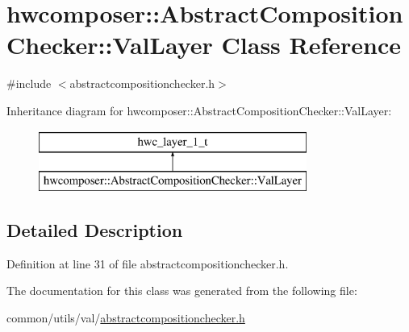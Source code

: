 \hypertarget{classhwcomposer_1_1AbstractCompositionChecker_1_1ValLayer}{}\section{hwcomposer\+:\+:Abstract\+Composition\+Checker\+:\+:Val\+Layer Class Reference}
\label{classhwcomposer_1_1AbstractCompositionChecker_1_1ValLayer}


{\ttfamily \#include $<$abstractcompositionchecker.\+h$>$}

Inheritance diagram for hwcomposer\+:\+:Abstract\+Composition\+Checker\+:\+:Val\+Layer\+:\begin{figure}[H]
\begin{center}
\leavevmode
\includegraphics[height=2.000000cm]{classhwcomposer_1_1AbstractCompositionChecker_1_1ValLayer}
\end{center}
\end{figure}


\subsection{Detailed Description}


Definition at line 31 of file abstractcompositionchecker.\+h.



The documentation for this class was generated from the following file\+:\begin{DoxyCompactItemize}
\item 
common/utils/val/\mbox{\hyperlink{abstractcompositionchecker_8h}{abstractcompositionchecker.\+h}}\end{DoxyCompactItemize}
